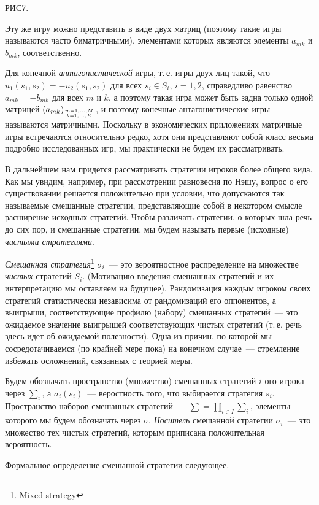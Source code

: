 \documentclass[12pt]{article}
\begin{document}
РИС7.

Эту же игру можно представить в виде двух матриц (поэтому такие игры
называются часто  биматричными), элементами которых являются
элементы $a_{mk}$ и $b_{mk}$, соответственно.

Для конечной {\it антагонистической} игры, т.\,е. игры двух лиц
такой, что $u_1(s_1,s_2)=-u_2(s_1,s_2)$ для всех $s_i\in S_i$,
$i=1,2$, справедливо равенство $a_{mk}=-b_{mk}$ для всех $m$ и $k$,
а поэтому такая игра может быть  задна только одной матрицей
$(a_{mk})_{m=1,\ldots,M\atop{k=1,\ldots,K}}$, и поэтому конечные
антагонистические игры называются матричными. Поскольку в
экономических приложениях матричные игры встречаются относительно
редко, хотя они представляют собой класс весьма подробно
исследованных игр, мы практически не будем их рассматривать.


В дальнейшем нам придется рассматривать стратегии игроков более
общего вида. Как мы увидим, например, при рассмотрении равновесия
по Нэшу, вопрос о его существовании решается положительно при
условии, что допускаются так называемые смешанные стратегии,
представляющие собой в некотором смысле расширение исходных
стратегий. Чтобы различать стратегии, о которых шла речь до сих
пор, и смешанные стратегии, мы будем называть первые (исходные)
\emph{чистыми стратегиями}.

{\it Смешанная стратегия}\footnote{Mixed strategy} $\sigma_i$~---
это вероятностное распределение на множестве {\it чистых} стратегий
$S_i$. (Мотивацию введения смешанных стратегий и их интерпретацию мы
оставляем на будущее). Рандомизация каждым  игроком своих стратегий
статистически независима от рандомизаций его оппонентов, а выигрыши,
соответствующие профилю (набору) смешанных стратегий~--- это
ожидаемое значение выигрышей соответствующих чистых стратегий
(т.\,е. речь здесь идет об ожидаемой полезности). Одна из причин, по
которой мы сосредотачиваемся (по крайней мере пока) на конечном
случае~--- стремление избежать осложнений, связанных с теорией меры.

Будем обозначать пространство (множество) смешанных стратегий
$i$-ого игрока через $\sum_i$, а $\sigma_i(s_i)$~--- веростность
того, что выбирается стратегия $s_i$. Пространство наборов
смешанных стратегий~--- $\sum=\prod_{i\in I}\sum_i$, элементы
которого мы будем обозначать через $\sigma$. {\it Носитель}
смешанной стратегии $\sigma_i$~--- это множество тех чистых
стратегий, которым приписана положительная вероятность.

Формальное определение смешанной стратегии следующее.
\end{document}
